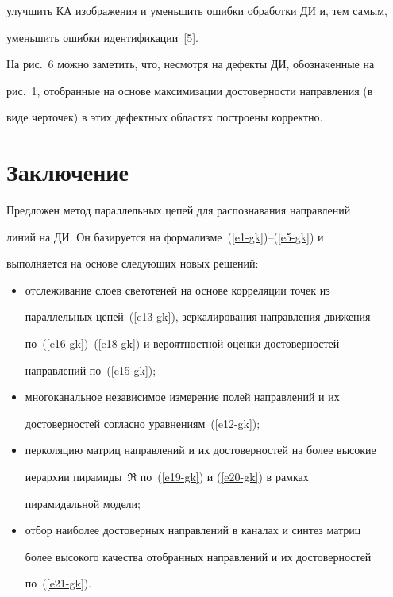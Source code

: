 \noindent


улучшить КА изображения и уменьшить ошибки обработки ДИ и, тем самым, 


уменьшить ошибки идентификации~[5].








  На рис.~6 можно заметить, что, несмотря на дефекты ДИ, обозначенные на 


рис.~1, отобранные на основе максимизации достоверности направления (в 


виде черточек) в этих дефектных областях построены корректно.





\section{Заключение}





  Предложен метод параллельных цепей для распознавания направлений 


линий на ДИ. Он базируется на формализме~(\ref{e1-gk})--(\ref{e5-gk}) и 


выполняется на основе следующих новых решений:


  \begin{itemize}


  \item отслеживание слоев светотеней на основе корреляции точек из 


параллельных цепей~(\ref{e13-gk}), зеркалирования направления движения 


по~(\ref{e16-gk})--(\ref{e18-gk}) и вероятностной оценки достоверностей 


направлений по~(\ref{e15-gk});


  \item многоканальное независимое измерение полей направлений и их 


достоверностей согласно уравнениям~(\ref{e12-gk});


  \item перколяцию матриц направлений и их достоверностей на более высокие 


иерархии пирамиды~$\mathfrak{R}$ по~(\ref{e19-gk}) и (\ref{e20-gk}) в рамках 


пирамидальной модели;


  \item отбор наиболее достоверных направлений в каналах и синтез матриц 


более высокого качества отобранных направлений и их достоверностей 


по~(\ref{e21-gk}). %


  \end{itemize}


